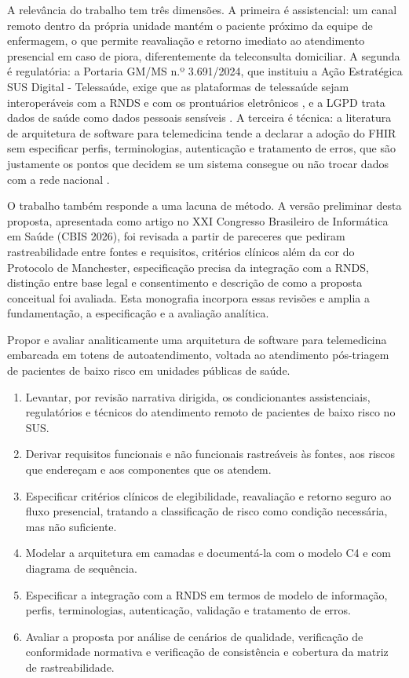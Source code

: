 A relevância do trabalho tem três dimensões. A primeira é assistencial: um canal remoto dentro da própria unidade mantém o paciente próximo da equipe de enfermagem, o que permite reavaliação e retorno imediato ao atendimento presencial em caso de piora, diferentemente da teleconsulta domiciliar. A segunda é regulatória: a Portaria GM/MS n.º 3.691/2024, que instituiu a Ação Estratégica SUS Digital - Telessaúde, exige que as plataformas de telessaúde sejam interoperáveis com a RNDS e com os prontuários eletrônicos \cite{portaria3691}, e a LGPD trata dados de saúde como dados pessoais sensíveis \cite{lgpd2018}. A terceira é técnica: a literatura de arquitetura de software para telemedicina tende a declarar a adoção do FHIR sem especificar perfis, terminologias, autenticação e tratamento de erros, que são justamente os pontos que decidem se um sistema consegue ou não trocar dados com a rede nacional \cite{jat2024}.

O trabalho também responde a uma lacuna de método. A versão preliminar desta proposta, apresentada como artigo no XXI Congresso Brasileiro de Informática em Saúde (CBIS 2026), foi revisada a partir de pareceres que pediram rastreabilidade entre fontes e requisitos, critérios clínicos além da cor do Protocolo de Manchester, especificação precisa da integração com a RNDS, distinção entre base legal e consentimento e descrição de como a proposta conceitual foi avaliada. Esta monografia incorpora essas revisões e amplia a fundamentação, a especificação e a avaliação analítica.



Propor e avaliar analiticamente uma arquitetura de software para telemedicina embarcada em totens de autoatendimento, voltada ao atendimento pós-triagem de pacientes de baixo risco em unidades públicas de saúde.


\begin{enumerate}
    \item Levantar, por revisão narrativa dirigida, os condicionantes assistenciais, regulatórios e técnicos do atendimento remoto de pacientes de baixo risco no SUS.
    \item Derivar requisitos funcionais e não funcionais rastreáveis às fontes, aos riscos que endereçam e aos componentes que os atendem.
    \item Especificar critérios clínicos de elegibilidade, reavaliação e retorno seguro ao fluxo presencial, tratando a classificação de risco como condição necessária, mas não suficiente.
    \item Modelar a arquitetura em camadas e documentá-la com o modelo C4 e com diagrama de sequência.
    \item Especificar a integração com a RNDS em termos de modelo de informação, perfis, terminologias, autenticação, validação e tratamento de erros.
    \item Avaliar a proposta por análise de cenários de qualidade, verificação de conformidade normativa e verificação de consistência e cobertura da matriz de rastreabilidade.
\end{enumerate}


